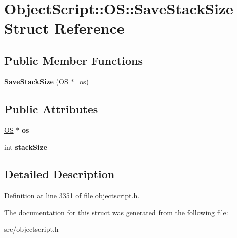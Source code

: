\hypertarget{struct_object_script_1_1_o_s_1_1_save_stack_size}{}\section{Object\+Script\+:\+:OS\+:\+:Save\+Stack\+Size Struct Reference}
\label{struct_object_script_1_1_o_s_1_1_save_stack_size}
\subsection*{Public Member Functions}
\begin{DoxyCompactItemize}
\item 
{\bfseries Save\+Stack\+Size} (\hyperlink{class_object_script_1_1_o_s}{OS} $\ast$\+\_\+os)\hypertarget{struct_object_script_1_1_o_s_1_1_save_stack_size_a402c6ecae13690b16af2bf163cb74533}{}\label{struct_object_script_1_1_o_s_1_1_save_stack_size_a402c6ecae13690b16af2bf163cb74533}

\end{DoxyCompactItemize}
\subsection*{Public Attributes}
\begin{DoxyCompactItemize}
\item 
\hyperlink{class_object_script_1_1_o_s}{OS} $\ast$ {\bfseries os}\hypertarget{struct_object_script_1_1_o_s_1_1_save_stack_size_a06d077968bf097fb588bf676591c2b9b}{}\label{struct_object_script_1_1_o_s_1_1_save_stack_size_a06d077968bf097fb588bf676591c2b9b}

\item 
int {\bfseries stack\+Size}\hypertarget{struct_object_script_1_1_o_s_1_1_save_stack_size_a1361cabc65d7bc08c4d6463b6aa041a0}{}\label{struct_object_script_1_1_o_s_1_1_save_stack_size_a1361cabc65d7bc08c4d6463b6aa041a0}

\end{DoxyCompactItemize}


\subsection{Detailed Description}


Definition at line 3351 of file objectscript.\+h.



The documentation for this struct was generated from the following file\+:\begin{DoxyCompactItemize}
\item 
src/objectscript.\+h\end{DoxyCompactItemize}

